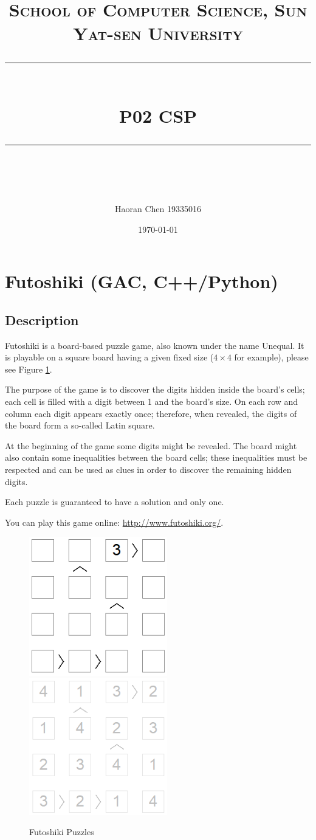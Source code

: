 \documentclass{article}
\title{	
\normalfont \normalsize
\textsc{School of Computer Science, Sun Yat-sen University} \\ [25pt] %
\rule{\textwidth}{0.5pt} \\[0.4cm] %
\huge  P02  CSP\\ %
\rule{\textwidth}{2pt} \\[0.5cm] %
\author{Haoran Chen 19335016}
\date{\today}
}
\begin{document}
\maketitle
\tableofcontents
\newpage







\section{Futoshiki (GAC, C++/Python)}
\subsection{Description}
Futoshiki is a board-based puzzle game, also known under the name Unequal. It is playable on a square board having a given fixed size ($4\times4$ for example), please see Figure \ref{fig:futoshiki}.

The purpose of the game is to discover the digits hidden inside the board's cells; each cell is filled with a digit between 1 and the board's size. On each row and column each digit appears exactly once; therefore, when revealed, the digits of the board form a so-called Latin square.

At the beginning of the game some digits might be revealed. The board might also contain some inequalities between the board cells; these inequalities must be respected and can be used as clues in order to discover the remaining hidden digits.

Each puzzle is guaranteed to have a solution and only one.

You can play this game online: \url{http://www.futoshiki.org/}.
\begin{figure}[h]
  \centering
  \includegraphics[width=6cm]{Pic/futoshiki1}
  \qquad
  \includegraphics[width=6cm]{Pic/futoshiki2}
  \caption{Futoshiki Puzzles}
  \label{fig:futoshiki}
\end{figure}
\end{document}
